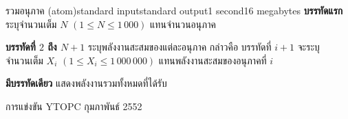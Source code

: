 \documentclass[11pt,a4paper]{article}
\begin{document}
\begin{problem}{รวมอนุภาค (atom)}{standard input}{standard output}{1 second}{16 megabytes}
\textbf{บรรทัดแรก} ระบุจำนวนเต็ม $N$ $(1 \leq N \leq 1\,000)$ แทนจำนวนอนุภาค

\textbf{บรรทัดที่ $2$ ถึง $N+1$} ระบุพลังงานสะสมของแต่ละอนุภาค กล่าวคือ บรรทัดที่ $i+1$ จะระบุจำนวนเต็ม $X_i$ $(1 \leq X_i \leq 1\,000\,000)$ แทนพลังงานสะสมของอนุภาคที่ $i$

\OutputFile

\textbf{มีบรรทัดเดียว} แสดงพลังงานรวมทั้งหมดที่ได้รับ

\Examples

\begin{example}
%
\end{example}


\Source

การแข่งขัน YTOPC กุมภาพันธ์ 2552

\end{problem}
\end{document}
